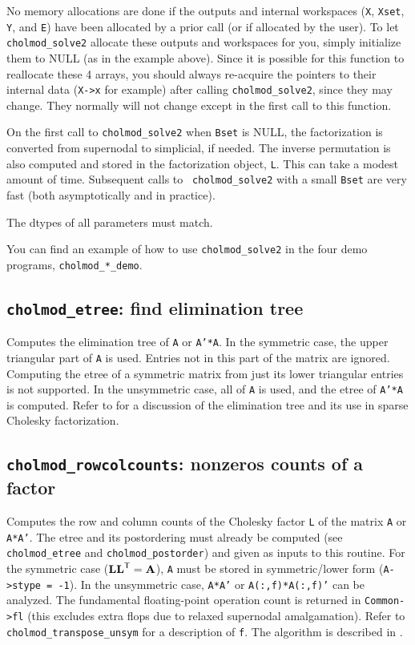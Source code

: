 \documentclass[11pt]{article}
\newcommand{\m}[1]{{\bf{#1}}}       %
\newcommand{\tr}{^{\sf T}}          %
\begin{document}
No memory allocations are done if the outputs and internal workspaces ({\tt X},
{\tt Xset}, {\tt Y}, and {\tt E}) have been allocated by a prior call (or if
allocated by the user).  To let {\tt cholmod\_solve2} allocate these outputs
and workspaces for you, simply initialize them to NULL (as in the example
above).  Since it is possible for this function to reallocate these 4 arrays,
you should always re-acquire the pointers to their internal data ({\tt X->x}
for example) after calling {\tt cholmod\_solve2}, since they may change.  They
normally will not change except in the first call to this function.

On the first call to {\tt cholmod\_solve2} when {\tt Bset} is NULL, the
factorization is converted from supernodal to simplicial, if needed.  The
inverse permutation is also computed and stored in the factorization object,
{\tt L}.  This can take a modest amount of time.  Subsequent calls to {\tt
cholmod\_solve2} with a small {\tt Bset} are very fast (both asymptotically and
in practice).

The dtypes of all parameters must match.

You can find an example of how to use {\tt cholmod\_solve2} in the
four demo programs, {\tt cholmod\_*\_demo}.

\subsection{{\tt cholmod\_etree}: find elimination tree}


Computes the elimination tree of {\tt A} or {\tt A'*A}.  In the symmetric case,
the upper triangular part of {\tt A} is used.  Entries not in this part of the
matrix are ignored.  Computing the etree of a symmetric matrix from just its
lower triangular entries is not supported.  In the unsymmetric case, all of
{\tt A} is used, and the etree of {\tt A'*A} is computed.  Refer to
\cite{Liu90a} for a discussion of the elimination tree and its use in sparse
Cholesky factorization.

\subsection{{\tt cholmod\_rowcolcounts}: nonzeros counts of a factor}


Computes the row and column counts of the Cholesky factor {\tt L} of the matrix
{\tt A} or {\tt A*A'}.  The etree and its postordering must already be computed
(see {\tt cholmod\_etree} and {\tt cholmod\_postorder}) and given as inputs to
this routine.  For the symmetric case ($\m{LL}\tr=\m{A}$), {\tt A} must be
stored in symmetric/lower form ({\tt A->stype = -1}).  In the unsymmetric case,
{\tt A*A'} or {\tt A(:,f)*A(:,f)'} can be analyzed.  The fundamental
floating-point operation count is returned in {\tt Common->fl} (this excludes
extra flops due to relaxed supernodal amalgamation).  Refer to {\tt
cholmod\_transpose\_unsym} for a description of {\tt f}.  The algorithm is
described in \cite{GilbertLiNgPeyton01,GilbertNgPeyton94}.
\end{document}
